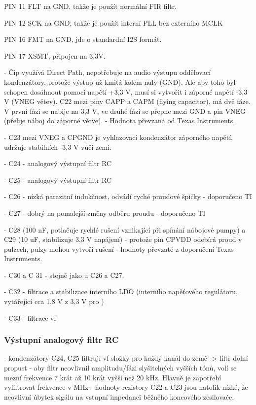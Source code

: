 PIN 11 FLT na GND, takže je použít normální FIR filtr.

PIN 12 SCK na GND, takže je použít interní PLL bez externího MCLK

PIN 16 FMT na GND, jde o standardní I2S formát.

PIN 17 XSMT, připojen na 3,3V.


- Čip využívá Direct Path, nepotřebuje na audio výstupu oddělovací kondenzátory, protože výstup už kmitá kolem nuly (GND). Ale aby toho byl schopen dosáhnout pomocí napětí +3,3 V, musí si vytvořit i záporné napětí -3,3 V (VNEG větev). C22 mezi piny CAPP a CAPM (flying capacitor), má dvě fáze. V první fázi se nabije na 3,3 V, ve druhé fázi se přepne mezi GND a pin VNEG (přelije náboj do záporné větve). - Hodnota převzaná od Texas Instruments.

- C23 mezi VNEG a CPGND je vyhlazovací kondenzátor záporného napětí, udržuje stabilních -3,3 V vůči zemi. 

- C24 - analogový výstupní filtr RC

- C25 - analogový výstupní filtr RC

- C26 - nízká parazitní indukčnost, odvádí ryché proudové špičky - doporučeno TI

- C27 - dobrý na pomalejší změny odběru proudu - doporučeno TI

- C28 (100 nF, potlačuje rychlé rušení vznikající při spínání nábojové pumpy) a C29 (10 uF, stabilizuje 3,3 V napájení) - protože pin CPVDD odebírá proud v pulzech, pulzy mohou vytvoři rušení - hodnoty převzaté z doporučení Texas Instruments.

- C30 a C 31 - stejně jako u C26 a C27.

- C32 - filtrace a stabilizace interního LDO (interního napěťového regulátoru, vytářející cca 1,8 V z 3,3 V pro )

- C33 - filtrace vf 

\subsubsection{Výstupní analogový filtr RC}

- kondenzátory C24, C25 filtrují vf složky pro každý kanál do země -> filtr dolní propust
- aby filtr neovlivnil amplitudu/fázi slyšitelných vyšších tónů, volí se mezní frekvence 7 krát až 10 krát vyšší než 20 kHz. Hlavně je zapotřebí vyfiltrovat frekvence v MHz
- hodnoty rezistory C22 a C23 jsou natolik nízké, že neovlivní úbytek sigálu na vstupní impedanci běžného koncového zesilovače.

